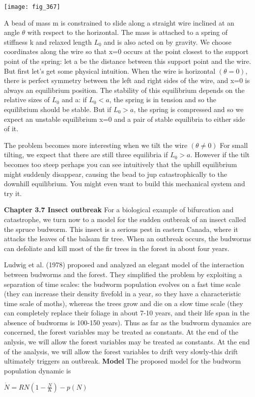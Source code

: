 \documentclass{article}
\newcommand\tab[1][1cm]{\hspace*{#1}}
\begin{document}
\texttt{[image: fig\_367]}

A bead of mass m is constrained to slide along a straight wire inclined at an angle $\theta$ with respect to the horizontal. The mass is attached to a spring of stiffness k and relaxed length $L_{0}$ and is also acted on by gravity. We choose coordinates along the wire so that x=0 occurs at the point closest to the support point of the spring: let a be the distance between this support point and the wire. \\ \tab
But first let's get some physical intuition. When the wire is horizontal $(\theta = 0)$, there is perfect symmetry between the left and right sides of the wire, and x=0 is always an equilibrium position. The stability of this equilibrium depends on the relative sizes of $L_{0}$ and a: if $L_{0}<a$, the spring is in tension and so the equilibrium should be stable. But if $L_{0}>a$, the spring is compressed and so we expect an unstable equilibrium x=0 and a pair of stable equilibria to either side of it. \\ \tab

The problem becomes more interesting when we tilt the wire $(\theta \neq 0)$ For small tilting, we expect that there are still three equilibria if $L_{0} > a$. However if the tilt becomes too steep perhaps you can see intuitively that the uphill equilibrium might suddenly disappear, causing the bead to jup catastrophically to the downhill equilibrium. You might even want to build this mechanical system and try it.

\textbf {Chapter 3.7 Insect outbreak}
For a biological example of bifurcation and catastrophe, we turn now to a model for the sudden outbreak of an insect called the spruce budworm. This insect is a serious pest in eastern Canada, where it attacks the leaves of the balsam fir tree. When an outbreak occurs, the budworms can defoliate and kill most of the fir trees in the forest in about four years. \\ \tab

Ludwig et al. (1978) proposed and analyzed an elegant model of the interaction between budworms and the forest. They simplified the problem by exploiting a separation of time scales: the budworm population evolves on a fast time scale (they can increase their density fivefold in a year, so they have a characteristic time scale of moths), whereas the trees grow and die on a slow time scale (they can completely replace their foliage in about 7-10 years, and their life span in the absence of budworms is 100-150 years). Thus as far as the budworm dynamics are concerned, the forest variables may be treated as constants. At the end of the anlysis, we will allow the forest variables may be treated as constants. At the end of the analysis, we will allow the forest variables to drift very slowly-this drift ultimately triggers an outbreak. 
\textbf {Model}
The proposed model for the budworm population dynamic is
\begin{center}
$\dot{N}=RN(1-\frac{N}{K})-p(N)$
\end{center}
\end{document}
